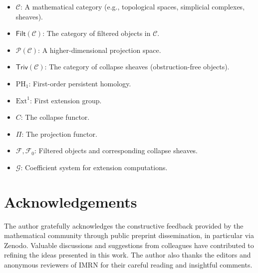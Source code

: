 \documentclass[11pt]{article}
\begin{document}
\begin{itemize}
    \item $\mathcal{C}$: A mathematical category (e.g., topological spaces, simplicial complexes, sheaves).
    \item $\mathsf{Filt}(\mathcal{C})$: The category of filtered objects in $\mathcal{C}$.
    \item $\mathcal{P}(\mathcal{C})$: A higher-dimensional projection space.
    \item $\mathsf{Triv}(\mathcal{C})$: The category of collapse sheaves (obstruction-free objects).
    \item $\mathrm{PH}_1$: First-order persistent homology.
    \item $\mathrm{Ext}^1$: First extension group.
    \item $C$: The collapse functor.
    \item $\Pi$: The projection functor.
    \item $\mathcal{F}, \mathcal{F}_0$: Filtered objects and corresponding collapse sheaves.
    \item $\mathcal{G}$: Coefficient system for extension computations.
\end{itemize}


\section*{Acknowledgements}

The author gratefully acknowledges the constructive feedback provided by the mathematical community through public preprint dissemination, in particular via Zenodo. Valuable discussions and suggestions from colleagues have contributed to refining the ideas presented in this work. The author also thanks the editors and anonymous reviewers of IMRN for their careful reading and insightful comments.
\end{document}
